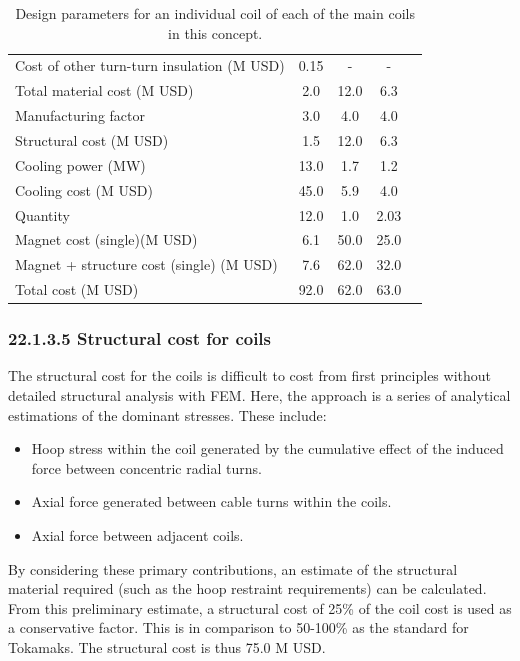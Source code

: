\begin{table}[h]
{\begin{tabular}{lcccc}
Cost of other turn-turn insulation (M USD) & 0.15 & - & - \\
Total material cost (M USD) & 2.0 & 12.0 & 6.3 \\
Manufacturing factor & 3.0 & 4.0 & 4.0 \\
Structural cost (M USD) & 1.5 & 12.0 & 6.3 \\
Cooling power (MW) & 13.0 & 1.7 & 1.2 \\
Cooling cost (M USD) & 45.0 & 5.9 & 4.0 \\
Quantity & 12.0 & 1.0 & 2.03 \\
Magnet cost (single)(M USD) & 6.1 & 50.0 & 25.0 \\
Magnet + structure cost (single) (M USD) & 7.6 & 62.0 & 32.0 \\
\hline
Total cost (M USD) & 92.0 & 62.0 & 63.0 \\
\hline
\end{tabular}}
\caption{Design parameters for an individual coil of each of the main coils in this concept.}
\label{your-table-label}
\end{table}



\subsubsection*{22.1.3.5 Structural cost for coils}

The structural cost for the coils is difficult to cost from first principles without detailed structural analysis with FEM. Here, the approach is a series of analytical estimations of the dominant stresses. These include:

\begin{itemize}
    \item Hoop stress within the coil generated by the cumulative effect of the induced force between concentric radial turns.
    \item Axial force generated between cable turns within the coils. 
    \item Axial force between adjacent coils.
\end{itemize}


By considering these primary contributions, an estimate of the structural material required (such as the hoop restraint requirements) can be calculated. From this preliminary estimate, a structural cost of 25\% of the coil cost is used as a conservative factor. This is in comparison to 50-100\% as the standard for Tokamaks. The structural cost is thus 75.0 M USD.


